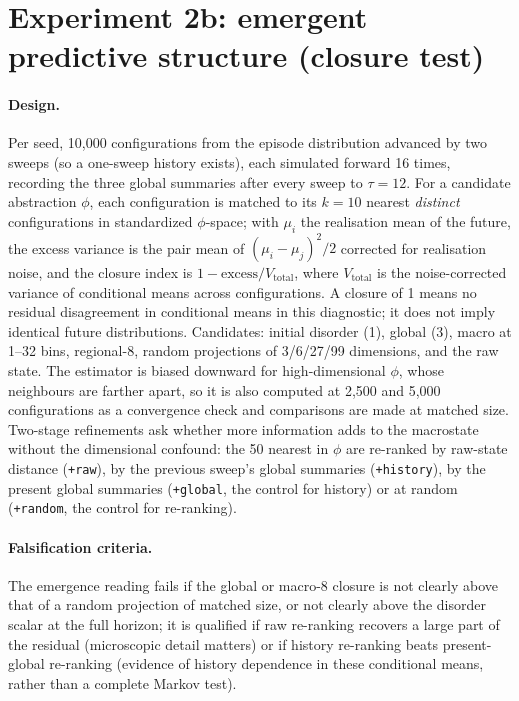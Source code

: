 \documentclass[11pt,a4paper]{article}
\begin{document}
\section{Experiment 2b: emergent predictive structure (closure test)}\label{sec:exp2b-design}

\paragraph{Design.}
Per seed, 10,000 configurations from the episode distribution advanced by two
sweeps (so a one-sweep history exists), each simulated forward 16 times,
recording the three global summaries after every sweep to $\tau=12$. For a
candidate abstraction $\phi$, each configuration is matched to its $k=10$
nearest \emph{distinct} configurations in standardized $\phi$-space; with
$\mu_i$ the realisation mean of the future, the excess variance is the pair
mean of $(\mu_i-\mu_j)^2/2$ corrected for realisation noise, and the closure
index is $1-\text{excess}/V_{\text{total}}$, where $V_{\text{total}}$ is the
noise-corrected variance of conditional means across configurations. A closure
of 1 means no residual disagreement in conditional means in this diagnostic;
it does not imply identical future distributions. Candidates: initial disorder (1), global (3), macro at 1--32 bins,
regional-8, random projections of 3/6/27/99 dimensions, and the raw state. The
estimator is biased downward for high-dimensional $\phi$, whose neighbours are
farther apart, so it is also computed at 2,500 and 5,000 configurations as a
convergence check and comparisons are made at matched size. Two-stage
refinements ask whether more information adds to the macrostate without the
dimensional confound: the 50 nearest in $\phi$ are re-ranked by raw-state
distance (\texttt{+raw}), by the previous sweep's global summaries
(\texttt{+history}), by the present global summaries (\texttt{+global}, the
control for history) or at random (\texttt{+random}, the control for
re-ranking).

\paragraph{Falsification criteria.}
The emergence reading fails if the global or macro-8 closure is not clearly
above that of a random projection of matched size, or not clearly above the
disorder scalar at the full horizon; it is qualified if raw re-ranking
recovers a large part of the residual (microscopic detail matters) or if
history re-ranking beats present-global re-ranking (evidence of history
dependence in these conditional means, rather than a complete Markov test).
\end{document}
